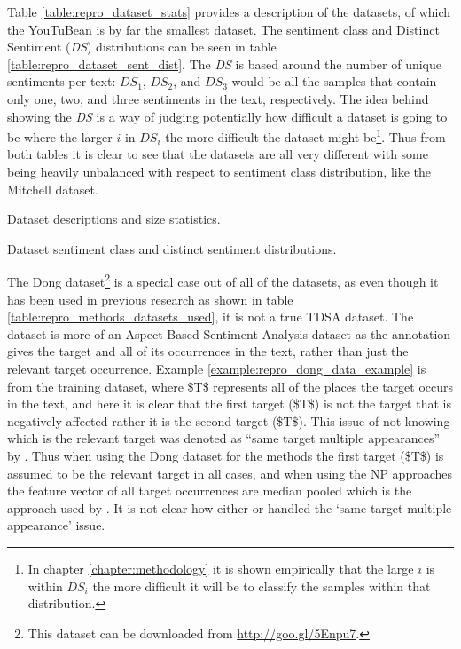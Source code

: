 Table \ref{table:repro_dataset_stats} provides a description of the datasets, of which the YouTuBean is by far the smallest dataset. The sentiment class and Distinct Sentiment (\textit{DS}) distributions can be seen in table \ref{table:repro_dataset_sent_dist}. The \textit{DS} \citep{wang-etal-2017-tdparse} is based around the number of unique sentiments per text: $DS_1$, $DS_2$, and $DS_3$ would be all the samples that contain only one, two, and three sentiments in the text, respectively. The idea behind showing the \textit{DS} is a way of judging potentially how difficult a dataset is going to be where the larger $i$ in $DS_i$ the more difficult the dataset might be\footnote{In chapter \ref{chapter:methodology} it is shown empirically that the large $i$ is within $DS_i$ the more difficult it will be to classify the samples within that distribution.}. Thus from both tables it is clear to see that the datasets are all very different with some being heavily unbalanced with respect to sentiment class distribution, like the Mitchell dataset.

\begin{table}[!h]
    \centering
    
    \caption{Dataset descriptions and size statistics.}
    \label{table:repro_dataset_stats}
\end{table}

\begin{table}[!h]
    \centering
    
    \caption{Dataset sentiment class and distinct sentiment distributions.}
    \label{table:repro_dataset_sent_dist}
\end{table}

The Dong dataset\footnote{This dataset can be downloaded from \url{http://goo.gl/5Enpu7}.} is a special case out of all of the datasets, as even though it has been used in previous research as shown in table \ref{table:repro_methods_datasets_used}, it is not a true TDSA dataset. The dataset is more of an Aspect Based Sentiment Analysis dataset as the annotation gives the target and all of its occurrences in the text, rather than just the relevant target occurrence. Example \ref{example:repro_dong_data_example} is from the training dataset, where \$T\$ represents all of the places the target occurs in the text, and here it is clear that the first target (\$T\$) is not the target that is negatively affected rather it is the second target (\$T\$). This issue of not knowing which is the relevant target was denoted as ``same target multiple appearances'' by \citet{wang-etal-2017-tdparse}. Thus when using the Dong dataset for the \citet{tang-etal-2016-effective} methods the first target (\$T\$) is assumed to be the relevant target in all cases, and when using the NP approaches the feature vector of all target occurrences are median pooled which is the approach used by \citet{wang-etal-2017-tdparse}. It is not clear how either \citet{vo2015target} or \citet{tang-etal-2016-effective} handled the `same target multiple appearance' issue.

